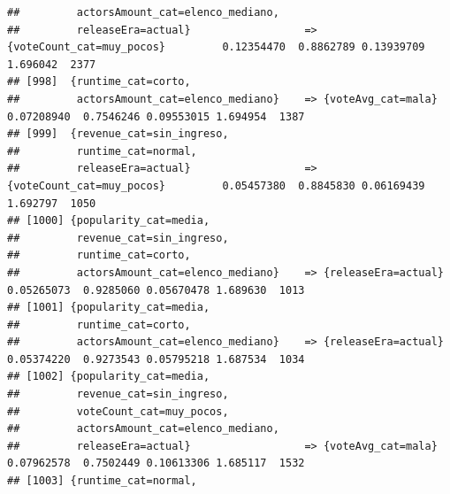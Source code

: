 \documentclass[
]{article}
\begin{document}
\begin{verbatim}
##         actorsAmount_cat=elenco_mediano,                                                                                        
##         releaseEra=actual}                  => {voteCount_cat=muy_pocos}         0.12354470  0.8862789 0.13939709 1.696042  2377
## [998]  {runtime_cat=corto,                                                                                                      
##         actorsAmount_cat=elenco_mediano}    => {voteAvg_cat=mala}                0.07208940  0.7546246 0.09553015 1.694954  1387
## [999]  {revenue_cat=sin_ingreso,                                                                                                
##         runtime_cat=normal,                                                                                                     
##         releaseEra=actual}                  => {voteCount_cat=muy_pocos}         0.05457380  0.8845830 0.06169439 1.692797  1050
## [1000] {popularity_cat=media,                                                                                                   
##         revenue_cat=sin_ingreso,                                                                                                
##         runtime_cat=corto,                                                                                                      
##         actorsAmount_cat=elenco_mediano}    => {releaseEra=actual}               0.05265073  0.9285060 0.05670478 1.689630  1013
## [1001] {popularity_cat=media,                                                                                                   
##         runtime_cat=corto,                                                                                                      
##         actorsAmount_cat=elenco_mediano}    => {releaseEra=actual}               0.05374220  0.9273543 0.05795218 1.687534  1034
## [1002] {popularity_cat=media,                                                                                                   
##         revenue_cat=sin_ingreso,                                                                                                
##         voteCount_cat=muy_pocos,                                                                                                
##         actorsAmount_cat=elenco_mediano,                                                                                        
##         releaseEra=actual}                  => {voteAvg_cat=mala}                0.07962578  0.7502449 0.10613306 1.685117  1532
## [1003] {runtime_cat=normal,                                                                                                     

\end{verbatim}
\end{document}
